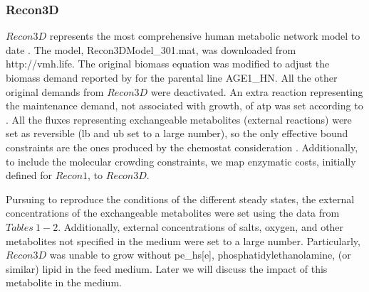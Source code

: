 	\subsubsection{Recon3D}
	
	$Recon3D$ represents the most comprehensive human metabolic network model to date . The model, Recon3DModel\_301.mat, was downloaded from http://vmh.life. The original biomass equation was modified to adjust the biomass demand reported by  for the parental line AGE1\_HN. All the other original demands from $Recon3D$ were deactivated. An extra reaction representing the maintenance demand, not associated with growth, of atp was set according to . All the fluxes representing exchangeable metabolites (external reactions) were set as reversible (lb and ub set to a large number), so the only effective bound constraints are the ones produced by the chemostat consideration . Additionally, to include the molecular crowding constraints, we map  enzymatic costs, initially defined for $Recon1$, to $Recon3D$.
	
	Pursuing to reproduce the conditions of the different steady states, the external concentrations of the exchangeable metabolites were set using the data from $Tables\ 1-2$. Additionally, external concentrations of salts, oxygen, and other metabolites not specified in the medium were set to a large number. Particularly, $Recon3D$ was unable to grow without pe\_hs[e], phosphatidylethanolamine, (or similar) lipid in the feed medium. Later we will discuss the impact of this metabolite in the medium. 